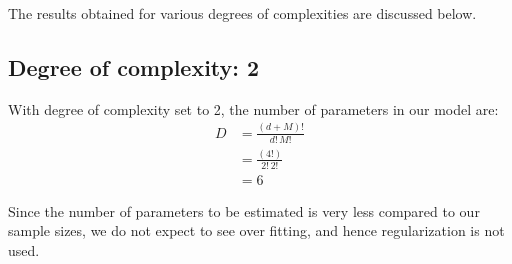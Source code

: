 \documentclass[12pt,a4paper]{article}
\newcommand{\noi}{\noindent}
\begin{document}
The results obtained for various degrees of complexities are discussed below. 

\subsection{Degree of complexity: 2}
With degree of complexity set to 2, the number of parameters in our model are:
\begin{equation}
\begin{split}
 D &= \frac{(d+M)!}{d!\,M!} \\
   & =\frac{(4!)}{2!\,2!} \\
   & =6
\end{split}
\end{equation}

\noi
Since the number of parameters to be estimated is very less compared to our sample sizes, we do not expect to see over fitting, and hence regularization is not used. 
\end{document}
